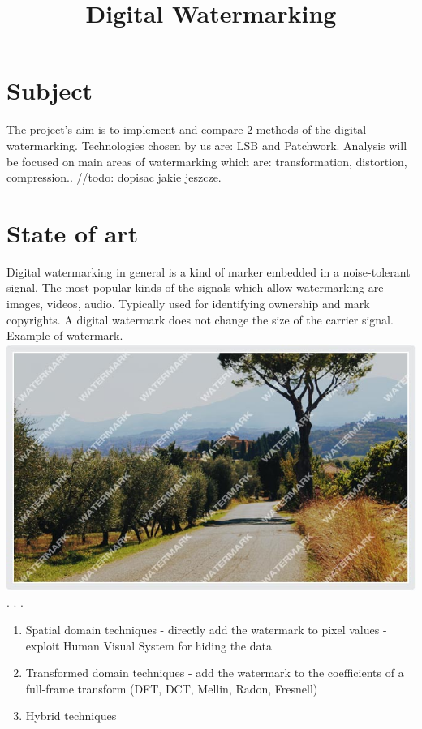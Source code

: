 \documentclass{article}
\begin{document}
\newpage
\title{Digital Watermarking}

	
\newpage
\tableofcontents

\newpage

\section{Subject}

The project's aim is to implement and compare 2 methods of the digital watermarking. Technologies chosen by us are: LSB and Patchwork.
Analysis will be focused on main areas of watermarking which are: transformation, distortion, compression.. //todo: dopisac jakie jeszcze. 

\section{State of art}

Digital watermarking in general is a kind of marker embedded in a noise-tolerant signal. The most popular kinds of the signals which allow watermarking are images, videos, audio. Typically used for identifying ownership and mark copyrights. A digital watermark does not change the size of the carrier signal.
Example of watermark.
\includegraphics{ex.png}
.
.
.

\begin{enumerate}
	\item Spatial domain techniques - directly add the watermark to pixel values - exploit Human Visual System for hiding the data
	\item Transformed domain techniques - add the watermark to the coefficients of a full-frame transform (DFT, DCT, Mellin, Radon, Fresnell)
	\item Hybrid techniques
\end{enumerate}
\end{document}
